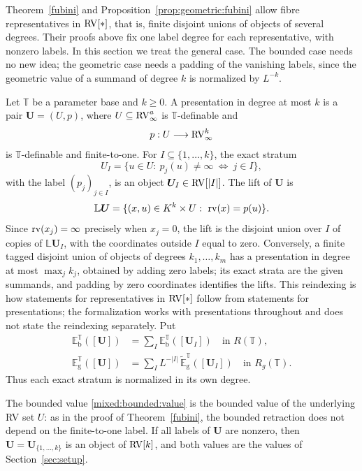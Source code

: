 Theorem~\ref{fubini} and Proposition~\ref{prop:geometric:fubini} allow
fibre representatives in $\mathrm{RV}[*]$, that is, finite disjoint unions of
objects of several degrees. Their proofs above fix one label degree for
each representative, with nonzero labels. In this section we treat the
general case. The bounded case needs no new idea; the geometric case
needs a padding of the vanishing labels, since the geometric value of a
summand of degree $k$ is normalized by $L^{-k}$.

\begin{defn}\label{defn:mixed:presentation}
Let $\mathbb T$ be a parameter base and $k\geq0$. A presentation in
degree at most $k$ is a pair $\bm U=(U,p)$, where
$U\subseteq\mathrm{RV}_\infty^a$ is $\mathbb T$-definable and
\[
 p:U\longrightarrow\mathrm{RV}_\infty^k
\]
is $\mathbb T$-definable and finite-to-one. For $I\subseteq\{1,\ldots,k\}$,
the exact stratum
\[
 U_I=\{u\in U:\ p_j(u)\neq\infty\ \Longleftrightarrow\ j\in I\},
\]
with the label $(p_j)_{j\in I}$, is an object $\bm U_I\in\mathrm{RV}[|I|]$.
The lift of $\bm U$ is
\[
 \mathbb L\bm U=\{(x,u)\in K^k\times U:\ \rv(x)=p(u)\}.
\]
Since $\operatorname{rv}(x_j)=\infty$ precisely when $x_j=0$, the lift is the disjoint
union over $I$ of copies of $\mathbb L\bm U_I$, with the coordinates
outside $I$ equal to zero. Conversely, a finite tagged disjoint union of
objects of degrees $k_1,\ldots,k_m$ has a presentation in degree at most
$\max_j k_j$, obtained by adding zero labels; its exact strata are the
given summands, and padding by zero coordinates identifies the lifts. This
reindexing is how statements for representatives in $\mathrm{RV}[*]$ follow from
statements for presentations; the formalization works with presentations
throughout and does not state the reindexing separately. Put
\begin{align}
 \mathbb E_{\mathrm b}^{\mathbb T}([\bm U])
   &=\sum_I\mathbb E_{\mathrm b}^{\mathbb T}([\bm U_I])\quad\text{in }R(\mathbb T),
 \label{mixed:bounded:value}\\
 \mathbb E_{\mathrm g}^{\mathbb T}([\bm U])
   &=\sum_I L^{-|I|}\,\widetilde{\mathbb E}_{\mathrm g}^{\mathbb T}([\bm U_I])
   \quad\text{in }R_g(\mathbb T).
 \label{mixed:geometric:value}
\end{align}
Thus each exact stratum is normalized in its own degree.
\end{defn}

The bounded value \eqref{mixed:bounded:value} is the bounded value of the
underlying RV set $U$: as in the proof of Theorem~\ref{fubini}, the bounded
retraction does not depend on the finite-to-one label. If all labels of
$\bm U$ are nonzero, then $\bm U=\bm U_{\{1,\ldots,k\}}$ is an object of
$\mathrm{RV}[k]$, and both values are the values of Section~\ref{sec:setup}.

